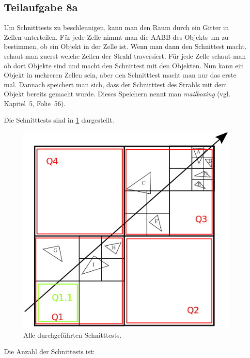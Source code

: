 \documentclass[a4paper]{scrartcl}
\begin{document}
\subsection*{Teilaufgabe 8a}
Um Schnitttests zu beschleunigen, kann man den Raum durch ein Gitter in Zellen
unterteilen. Für jede Zelle nimmt man die AABB des Objekts um zu bestimmen,
ob ein Objekt in der Zelle ist. Wenn man dann den Schnittest macht, schaut man
zuerst welche Zellen der Strahl traversiert. Für jede Zelle schaut man ob dort
Objekte sind und macht den Schnittest mit den Objekten. Nun kann ein Objekt in
mehreren Zellen sein, aber den Schnitttest macht man nur das erste mal. Dannach
speichert man sich, dass der Schnitttest des Strahls mit dem Objekt bereits
gemacht wurde. Dieses Speichern nennt man \textit{mailboxing} (vgl. Kapitel~5, Folie~56).

Die Schnitttests sind in \cref{fig:schnitttests} dargestellt.

\begin{figure}[h]
    \centering
    \includegraphics*[width=0.8\linewidth, keepaspectratio]{schnittests.png}
    \caption{Alle durchgeführten Schnitttests.}
    \label{fig:schnitttests}
\end{figure}

Die Anzahl der Schnittests ist:
\end{document}
